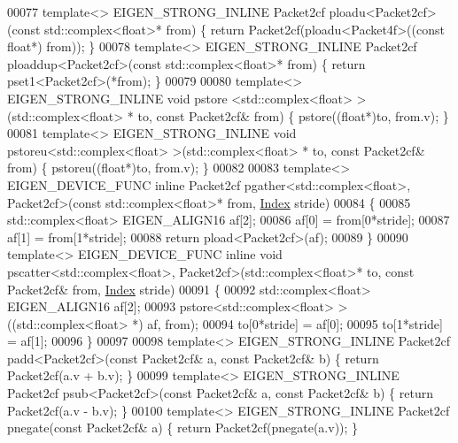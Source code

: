 \begin{DoxyCode}
00077 \textcolor{keyword}{template}<> EIGEN\_STRONG\_INLINE Packet2cf ploadu<Packet2cf>(\textcolor{keyword}{const} std::complex<float>*       from) \{ \textcolor{keywordflow}{return} 
      Packet2cf(ploadu<Packet4f>((\textcolor{keyword}{const} \textcolor{keywordtype}{float}*) from)); \}
00078 \textcolor{keyword}{template}<> EIGEN\_STRONG\_INLINE Packet2cf ploaddup<Packet2cf>(\textcolor{keyword}{const} std::complex<float>*     from) \{ \textcolor{keywordflow}{return} 
      pset1<Packet2cf>(*from); \}
00079 
00080 \textcolor{keyword}{template}<> EIGEN\_STRONG\_INLINE \textcolor{keywordtype}{void} pstore <std::complex<float> >(std::complex<float> *   to, \textcolor{keyword}{const} 
      Packet2cf& from) \{ pstore((\textcolor{keywordtype}{float}*)to, from.v); \}
00081 \textcolor{keyword}{template}<> EIGEN\_STRONG\_INLINE \textcolor{keywordtype}{void} pstoreu<std::complex<float> >(std::complex<float> *   to, \textcolor{keyword}{const} 
      Packet2cf& from) \{ pstoreu((\textcolor{keywordtype}{float}*)to, from.v); \}
00082 
00083 \textcolor{keyword}{template}<> EIGEN\_DEVICE\_FUNC \textcolor{keyword}{inline} Packet2cf pgather<std::complex<float>, Packet2cf>(\textcolor{keyword}{const} 
      std::complex<float>* from, \hyperlink{namespace_eigen_a62e77e0933482dafde8fe197d9a2cfde}{Index} stride)
00084 \{
00085   std::complex<float> EIGEN\_ALIGN16 af[2];
00086   af[0] = from[0*stride];
00087   af[1] = from[1*stride];
00088   \textcolor{keywordflow}{return} pload<Packet2cf>(af);
00089 \}
00090 \textcolor{keyword}{template}<> EIGEN\_DEVICE\_FUNC \textcolor{keyword}{inline} \textcolor{keywordtype}{void} pscatter<std::complex<float>, Packet2cf>(std::complex<float>* to, \textcolor{keyword}{
      const} Packet2cf& from, \hyperlink{namespace_eigen_a62e77e0933482dafde8fe197d9a2cfde}{Index} stride)
00091 \{
00092   std::complex<float> EIGEN\_ALIGN16 af[2];
00093   pstore<std::complex<float> >((std::complex<float> *) af, from);
00094   to[0*stride] = af[0];
00095   to[1*stride] = af[1];
00096 \}
00097 
00098 \textcolor{keyword}{template}<> EIGEN\_STRONG\_INLINE Packet2cf padd<Packet2cf>(\textcolor{keyword}{const} Packet2cf& a, \textcolor{keyword}{const} Packet2cf& b) \{ \textcolor{keywordflow}{return} 
      Packet2cf(a.v + b.v); \}
00099 \textcolor{keyword}{template}<> EIGEN\_STRONG\_INLINE Packet2cf psub<Packet2cf>(\textcolor{keyword}{const} Packet2cf& a, \textcolor{keyword}{const} Packet2cf& b) \{ \textcolor{keywordflow}{return} 
      Packet2cf(a.v - b.v); \}
00100 \textcolor{keyword}{template}<> EIGEN\_STRONG\_INLINE Packet2cf pnegate(\textcolor{keyword}{const} Packet2cf& a) \{ \textcolor{keywordflow}{return} Packet2cf(pnegate(a.v)); \}

\end{DoxyCode}
